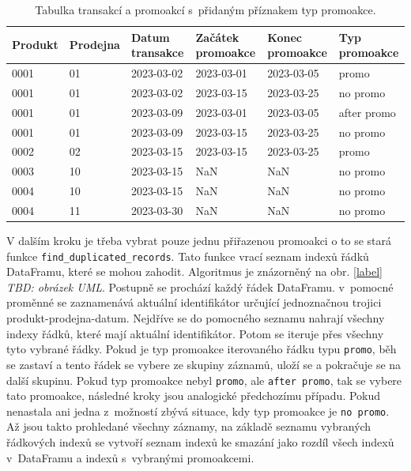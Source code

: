 \begin{table}[hbtp!]
    \centering
    \captionsetup{justification=centering}
    \caption{Tabulka transakcí a promoakcí s~přidaným příznakem typ promoakce.}
    \begin{tabular}{llp{2cm}p{2.1cm}p{2cm}p{2.5cm}}
        \toprule
        Produkt & Prodejna & Datum transakce & Začátek promoakce & Konec \newline promoakce& Typ \newline promoakce\\
        \midrule
        0001 & 01 & 2023-03-02 & 2023-03-01 & 2023-03-05 & promo \\
        0001 & 01 & 2023-03-02 & 2023-03-15 & 2023-03-25 & no promo \\
        0001 & 01 & 2023-03-09 & 2023-03-01 & 2023-03-05 & after promo \\
        0001 & 01 & 2023-03-09 & 2023-03-15 & 2023-03-25 & no promo \\
        0002 & 02 & 2023-03-15 & 2023-03-15 & 2023-03-25 & promo\\
        0003 & 10 & 2023-03-15 & NaN & NaN & no promo \\
        0004 & 10 & 2023-03-15 & NaN & NaN & no promo \\
        0004 & 11 & 2023-03-30 & NaN & NaN & no promo \\
        \bottomrule
    \end{tabular}
    \label{tab:tabulkalabely}
\end{table}

V dalším kroku je třeba vybrat pouze jednu přiřazenou promoakci o to se stará funkce \texttt{find\_duplicated\_records}. Tato funkce vrací seznam indexů řádků DataFramu, které se mohou zahodit. Algoritmus je znázorněný na obr. \ref*{label} \emph{TBD: obrázek UML}.
Postupně se prochází každý řádek DataFramu. v~pomocné proměnné se zaznamenává aktuální identifikátor určující jednoznačnou trojici produkt-prodejna-datum. Nejdříve se do pomocného seznamu nahrají všechny indexy řádků, které mají aktuální identifikátor. Potom se iteruje přes všechny tyto vybrané řádky. Pokud je typ promoakce iterovaného řádku typu \texttt{promo}, běh se zastaví a tento řádek se vybere ze skupiny záznamů, uloží se a pokračuje se na další skupinu. Pokud typ promoakce nebyl \texttt{promo}, ale \texttt{after promo}, tak se vybere tato promoakce, následné kroky jsou analogické předchozímu případu. Pokud nenastala ani jedna z~možností zbývá situace, kdy typ promoakce je \texttt{no promo}. Až jsou takto prohledané všechny záznamy, na základě seznamu vybraných řádkových indexů se vytvoří seznam indexů ke smazání jako rozdíl všech indexů v~DataFramu a indexů s~vybranými promoakcemi.

